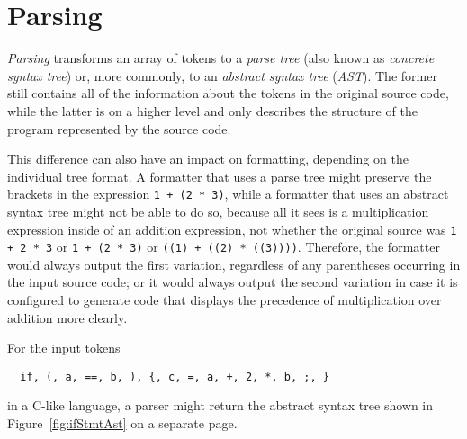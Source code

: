 \section{Parsing}
\textit{Parsing} transforms an array of tokens to a \textit{parse tree} (also known as
\textit{concrete syntax tree}) or, more commonly, to an \textit{abstract syntax tree} (\textit{AST}).
The former still contains all of the information about the tokens in the original source code,
while the latter is on a higher level and only describes
the structure of the program represented by the source code.

This difference can also have an impact on formatting, depending on the individual tree format.
A formatter that uses a parse tree might preserve the brackets in the expression
\texttt{1 + (2 * 3)}, while a formatter that uses an abstract syntax tree might
not be able to do so, because all it sees is a multiplication expression inside of an addition expression,
not whether the original source was \texttt{1 + 2 * 3} or \texttt{1 + (2 * 3)}
or \texttt{((1) + ((2) * ((3))))}.
Therefore, the formatter would always output the first variation,
regardless of any parentheses occurring in the input source code;
or it would always output the second variation in case it is configured to generate code
that displays the precedence of multiplication over addition more clearly.

For the input tokens
\begin{verbatim}
  if, (, a, ==, b, ), {, c, =, a, +, 2, *, b, ;, }
\end{verbatim}
in a C-like language, a parser might return the abstract syntax tree
shown in Figure~\ref{fig:ifStmtAst} on a separate page.


